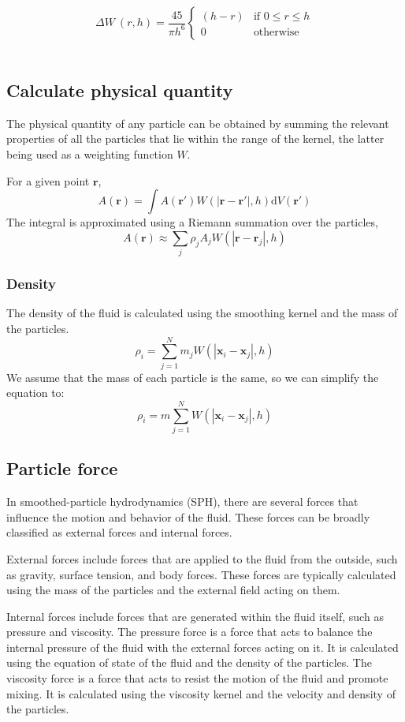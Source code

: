 \documentclass[acmtog]{acmart}
\begin{document}
\[
	\Delta W\ (r,h) = \frac{45}{\pi h^6} \begin{cases}
		(h - r) & \text{if } 0 \leq r \le h \\
		0       & \text{otherwise}
	\end{cases}
\]\

\subsection{Calculate physical quantity}

The physical quantity of any particle can be obtained by summing the relevant properties of all the particles that lie within the range of the kernel, the latter being used as a weighting function $W$.

For a given point $\boldsymbol{r}$,
\[A(\boldsymbol{r}) = \int A(\boldsymbol{r'})W(|\boldsymbol{r}-\boldsymbol{r'}|,h)\mathrm{d}V(\boldsymbol{r'})\]
The integral is approximated using a Riemann summation over the particles,
\[A(\boldsymbol{r}) \approx \sum_j \rho_j A_j W(|\boldsymbol{r}-\boldsymbol{r}_j|,h)\]

\subsubsection{Density}
The density of the fluid is calculated using the smoothing kernel and the mass of the particles.
\[
	\rho_i = \sum_{j=1}^N m_j W(|\boldsymbol{x}_i - \boldsymbol{x}_j|, h)
\]
We assume that the mass of each particle is the same, so we can simplify the equation to:
\[
	\rho_i = m \sum_{j=1}^N  W(|\boldsymbol{x}_i - \boldsymbol{x}_j|, h)
\]

\subsection{Particle force}
In smoothed-particle hydrodynamics (SPH), there are several forces that influence the motion and behavior of the fluid. These forces can be broadly classified as external forces and internal forces.

External forces include forces that are applied to the fluid from the outside, such as gravity, surface tension, and body forces. These forces are typically calculated using the mass of the particles and the external field acting on them.

Internal forces include forces that are generated within the fluid itself, such as pressure and viscosity. The pressure force is a force that acts to balance the internal pressure of the fluid with the external forces acting on it. It is calculated using the equation of state of the fluid and the density of the particles. The viscosity force is a force that acts to resist the motion of the fluid and promote mixing. It is calculated using the viscosity kernel and the velocity and density of the particles.
\end{document}
